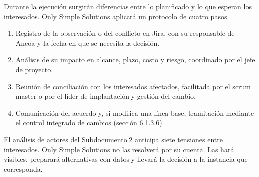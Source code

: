 \documentclass[11pt]{article}
\begin{document}
Durante la ejecución surgirán diferencias entre lo planificado y lo que
esperan los interesados. Only Simple Solutions aplicará un protocolo de
cuatro pasos.

\begin{enumerate}
\def\labelenumi{\arabic{enumi}.}
\item
  Registro de la observación o del conflicto en Jira, con su responsable
  de Ancoa y la fecha en que se necesita la decisión.
\item
  Análisis de su impacto en alcance, plazo, costo y riesgo, coordinado
  por el jefe de proyecto.
\item
  Reunión de conciliación con los interesados afectados, facilitada por
  el scrum master o por el líder de implantación y gestión del cambio.
\item
  Comunicación del acuerdo y, si modifica una línea base, tramitación
  mediante el control integrado de cambios (sección 6.1.3.6).
\end{enumerate}

El análisis de actores del Subdocumento 2 anticipa siete tensiones entre
interesados. Only Simple Solutions no las resolverá por su cuenta. Las
hará visibles, preparará alternativas con datos y llevará la decisión a
la instancia que corresponda.
\end{document}
